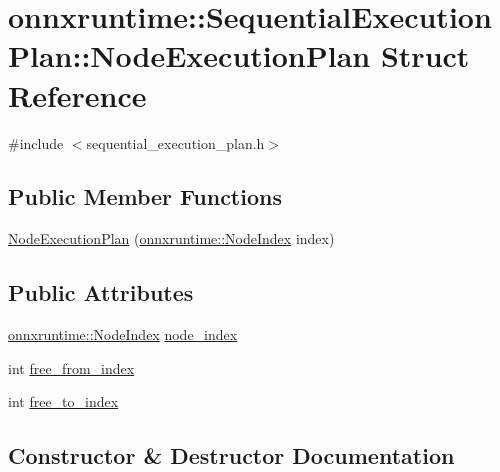 \hypertarget{structonnxruntime_1_1SequentialExecutionPlan_1_1NodeExecutionPlan}{}\section{onnxruntime\+:\+:Sequential\+Execution\+Plan\+:\+:Node\+Execution\+Plan Struct Reference}
\label{structonnxruntime_1_1SequentialExecutionPlan_1_1NodeExecutionPlan}


{\ttfamily \#include $<$sequential\+\_\+execution\+\_\+plan.\+h$>$}

\subsection*{Public Member Functions}
\begin{DoxyCompactItemize}
\item 
\mbox{\hyperlink{structonnxruntime_1_1SequentialExecutionPlan_1_1NodeExecutionPlan_a9655cef135e7265bb32a4f4b5dde0eb9}{Node\+Execution\+Plan}} (\mbox{\hyperlink{namespaceonnxruntime_af8773b5c12b5d8fd9292eb2e268df760}{onnxruntime\+::\+Node\+Index}} index)
\end{DoxyCompactItemize}
\subsection*{Public Attributes}
\begin{DoxyCompactItemize}
\item 
\mbox{\hyperlink{namespaceonnxruntime_af8773b5c12b5d8fd9292eb2e268df760}{onnxruntime\+::\+Node\+Index}} \mbox{\hyperlink{structonnxruntime_1_1SequentialExecutionPlan_1_1NodeExecutionPlan_a740ed6ec6f5a78135fd4f07661e19420}{node\+\_\+index}}
\item 
int \mbox{\hyperlink{structonnxruntime_1_1SequentialExecutionPlan_1_1NodeExecutionPlan_a836095fd0254db0cc83c44b1e2e2725e}{free\+\_\+from\+\_\+index}}
\item 
int \mbox{\hyperlink{structonnxruntime_1_1SequentialExecutionPlan_1_1NodeExecutionPlan_afceacda49cdbc15ed2ec7bff5ee68017}{free\+\_\+to\+\_\+index}}
\end{DoxyCompactItemize}


\subsection{Constructor \& Destructor Documentation}
\mbox{\label{structonnxruntime_1_1SequentialExecutionPlan_1_1NodeExecutionPlan_a9655cef135e7265bb32a4f4b5dde0eb9}} 
